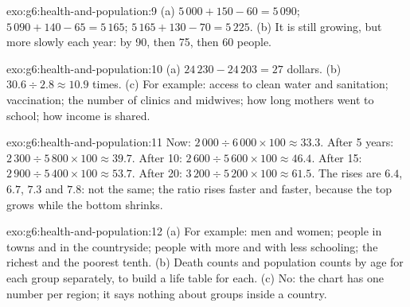 \begin{solution}{exo:g6:health-and-population:9}
(a) $5\,000 + 150 - 60 = 5\,090$; $5\,090 + 140 - 65 = 5\,165$; $5\,165 + 130 - 70 =
5\,225$. (b) It is still growing, but more slowly each year: by 90, then 75,
then 60 people.
\end{solution}

\begin{solution}{exo:g6:health-and-population:10}
(a) $24\,230 - 24\,203 = 27$ dollars. (b) $30.6 \div 2.8 \approx 10.9$ times.
(c) For example: access to clean water and sanitation; vaccination; the number of
clinics and midwives; how long mothers went to school; how income is shared.
\end{solution}

\begin{solution}{exo:g6:health-and-population:11}
Now: $2\,000 \div 6\,000 \times 100 \approx 33.3$. After 5 years: $2\,300 \div 5\,800
\times 100 \approx 39.7$. After 10: $2\,600 \div 5\,600 \times 100 \approx 46.4$.
After 15: $2\,900 \div 5\,400 \times 100 \approx 53.7$. After 20: $3\,200 \div 5\,200
\times 100 \approx 61.5$. The rises are $6.4$, $6.7$, $7.3$ and $7.8$: not the same;
the ratio rises faster and faster, because the top grows while the bottom shrinks.
\end{solution}

\begin{solution}{exo:g6:health-and-population:12}
(a) For example: men and women; people in towns and in the countryside; people
with more and with less schooling; the richest and the poorest tenth. (b) Death
counts and population counts by age for each group separately, to build a life
table for each. (c) No: the chart has one number per region; it says nothing
about groups inside a country.
\end{solution}

